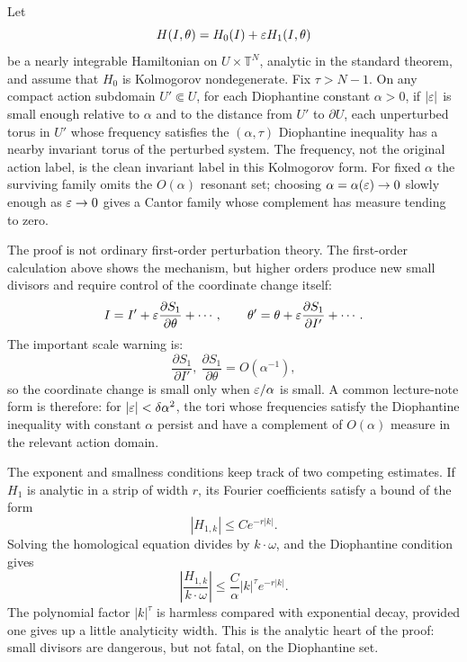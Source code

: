 \begin{proposition}
Let
\[
  H(I,\theta)=H_0(I)+\varepsilon H_1(I,\theta)
\]
be a nearly integrable Hamiltonian on \(U\times\mathbb T^N\), analytic in the
standard theorem, and assume that \(H_0\) is Kolmogorov nondegenerate. Fix
\(\tau>N-1\). On any compact action subdomain \(U'\Subset U\), for each
Diophantine constant \(\alpha>0\), if \(|\varepsilon|\) is small enough relative to
\(\alpha\) and to the distance from \(U'\) to \(\partial U\), each unperturbed
torus in \(U'\) whose frequency satisfies the \((\alpha,\tau)\) Diophantine
inequality has a nearby invariant torus of the perturbed system. The
frequency, not the original action label, is the clean invariant label in this
Kolmogorov form. For fixed \(\alpha\) the surviving family omits the
\(O(\alpha)\) resonant set; choosing
\(\alpha=\alpha(\varepsilon)\to0\) slowly enough as \(\varepsilon\to0\) gives a Cantor family
whose complement has measure tending to zero.
\end{proposition}

The proof is not ordinary first-order perturbation theory. The first-order
calculation above shows the mechanism, but higher orders produce new small
divisors and require control of the coordinate change itself:
\[
  I=I'+\varepsilon\frac{\partial S_1}{\partial\theta}+\cdots,
  \qquad
  \theta'=\theta+\varepsilon\frac{\partial S_1}{\partial I'}+\cdots.
\]
The important scale warning is:
\[
  \frac{\partial S_1}{\partial I'},\
  \frac{\partial S_1}{\partial \theta}
  =
  O(\alpha^{-1}),
\]
so the coordinate change is small only when \(\varepsilon/\alpha\) is small. A common
lecture-note form is therefore: for \(|\varepsilon|<\delta\alpha^2\), the tori whose
frequencies satisfy the Diophantine inequality with constant \(\alpha\) persist
and have a complement of \(O(\alpha)\) measure in the relevant action domain.

The exponent and smallness conditions keep track of two competing estimates. If
\(H_1\) is analytic in a strip of width \(r\), its Fourier coefficients satisfy
a bound of the form
\[
  |H_{1,k}|\leq C e^{-r|k|}.
\]
Solving the homological equation divides by \(k\cdot\omega\), and the
Diophantine condition gives
\[
  \left|\frac{H_{1,k}}{k\cdot\omega}\right|
  \leq
  \frac{C}{\alpha}|k|^\tau e^{-r|k|}.
\]
The polynomial factor \(|k|^\tau\) is harmless compared with exponential
decay, provided one gives up a little analyticity width. This is the analytic
heart of the proof: small divisors are dangerous, but not fatal, on the
Diophantine set.

